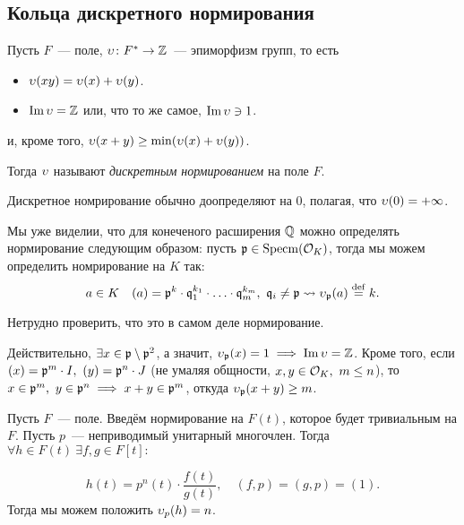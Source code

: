 
	\subsection{Кольца дискретного нормирования}

	\begin{definition} 
		Пусть $F$~--- поле, $\upsilon\colon F^{*} \to \mathbb{Z}$~--- эпиморфизм групп, то есть 
		\begin{itemize}
			\item $\upsilon(xy) = \upsilon(x) + \upsilon(y)$.
			\item $\mathop{\mathrm{Im}}\nolimits{\upsilon} = \mathbb{Z}$ или, что то же самое, $\mathop{\mathrm{Im}}\nolimits{\upsilon} \ni 1$.
		\end{itemize}
		и, кроме того, $\upsilon(x + y) \ge \min(\upsilon(x) + \upsilon(y))$.

		Тогда $\upsilon$ называют \emph{дискретным нормированием} на поле $F$. 
	\end{definition}

	\begin{remark}
		Дискретное номрирование обычно доопределяют на $0$, полагая, что $\upsilon(0) = +\infty$. 
	\end{remark}

	\begin{example}
		Мы уже виделии, что для конеченого расширения $\mathbb{Q}$ можно определять нормирование следующим образом: пусть $\mathfrak{p} \in \operatorname{Specm}(\mathcal{O}_{K})$, тогда мы можем определить номрирование на $K$ так: 
		\[
			a \in K \quad (a) = \mathfrak{p}^{k} \cdot \mathfrak{q}_{1}^{k_1} \cdot \ldots \cdot \mathfrak{q}_{m}^{k_m}, \ \mathfrak{q}_i \neq \mathfrak{p} \rightsquigarrow \upsilon_{\mathfrak{p}}(a) \stackrel{\mathrm{def}}{=} k.
		\]

		Нетрудно проверить, что это в самом деле нормирование. 

		Действительно, $\exists x \in \mathfrak{p} \setminus \mathfrak{p}^2$, а значит, $\upsilon_{\mathfrak{p}}(x) = 1 \implies \mathop{\mathrm{Im}}\nolimits{\upsilon} = \mathbb{Z}$. Кроме того, если $(x) = \mathfrak{p}^m \cdot I, \ (y) = \mathfrak{p}^n \cdot J$ (не умаляя общности, $x, y \in \mathcal{O}_{K}, \ m \le n$), то $x \in \mathfrak{p}^m, \ y \in \mathfrak{p}^n \implies x + y \in \mathfrak{p}^{m}$, откуда $\upsilon_{\mathfrak{p}}(x + y) \ge m$. 
	\end{example}

	\begin{example}
		Пусть $F$~--- поле. Введём нормирование на $F(t)$, которое будет тривиальным на $F$. Пусть $p$~--- неприводимый унитарный многочлен. Тогда $\forall h \in F(t) \ \exists f, g \in F[t]\colon$

		\[
			h(t) = p^n(t) \cdot \frac{f(t)}{g(t)}, \quad (f, p) = (g, p) = (1).
		\]
		Тогда мы можем положить $\upsilon_{p}(h) = n$.
	\end{example}

